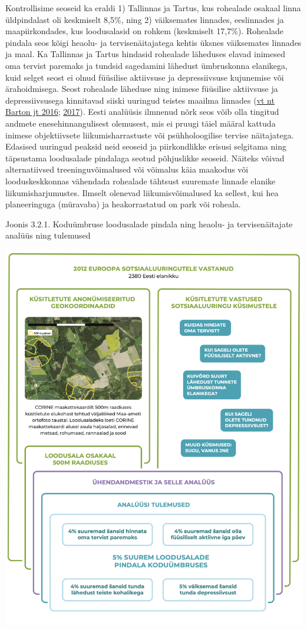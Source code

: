 \documentclass[estonian,]{article}
\begin{document}
Kontrollisime seoseid ka eraldi
1) Tallinnas ja Tartus, kus rohealade osakaal linna üldpindalast oli keskmiselt 8,5\%, ning
2) väiksemates linnades, eeslinnades ja maapiirkondades, kus loodusalasid on rohkem (keskmiselt 17,7\%).
Rohealade pindala seos kõigi heaolu- ja tervisenäitajatega kehtis üksnes väiksemates linnades ja maal. Ka Tallinnas ja Tartus hindasid rohealade läheduses elavad inimesed oma tervist paremaks ja tundsid sagedamini lähedust ümbruskonna elanikega, kuid selget seost ei olnud füüsilise aktiivsuse ja depressiivsuse kujunemise või ärahoidmisega. Seost rohealade läheduse ning inimese füüsilise aktiivsuse ja depressiivsusega kinnitavad siiski uuringud teistes maailma linnades (\protect\hyperlink{Barton2016}{vt nt Barton jt 2016}; \protect\hyperlink{Barton2017}{2017}). Eesti analüüsis ilmnenud nõrk seos võib olla tingitud andmete enesehinnangulisest olemusest, mis ei pruugi täiel määral kattuda inimese objektiivsete liikumisharrastuste või psühholoogilise tervise näitajatega. Edasised uuringud peaksid neid seoseid ja piirkondlikke erisusi selgitama ning täpsustama loodusalade pindalaga seotud põhjuslikke seoseid. Näiteks võivad alternatiivsed treeninguvõimalused või võimalus käia maakodus või looduskeskkonnas vähendada rohealade tähtsust suuremate linnade elanike liikumisharjumustes. Ilmselt olenevad liikumisvõimalused ka sellest, kui hea planeeringuga (müravaba) ja heakorrastatud on park või roheala.

{Joonis 3.2.1.} Koduümbruse loodusalade pindala ning heaolu- ja tervisenäitajate analüüs ning tulemused

\begin{center}\includegraphics[width=0.9\linewidth]{figures/3-chapter/fig321} \end{center}
\end{document}
